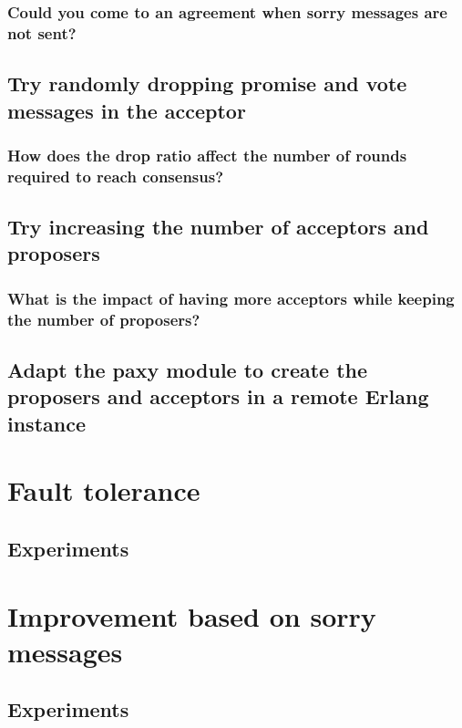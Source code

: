 \documentclass[a4paper, 10pt]{article}
\begin{document}
\subsubsection{Could you come to an agreement when sorry messages are not sent?}

\subsection{Try randomly dropping promise and vote messages in the acceptor}

\subsubsection{How does the drop ratio affect the number of rounds required to reach consensus?}

\subsection{Try increasing the number of acceptors and proposers}

\subsubsection{What is the impact of having more acceptors while keeping the number of proposers?}

\subsection{Adapt the paxy module to create the proposers and acceptors in a remote Erlang instance}



\section{Fault tolerance}

\subsection{Experiments}

\section{Improvement based on sorry messages}

\subsection{Experiments}
\end{document}
